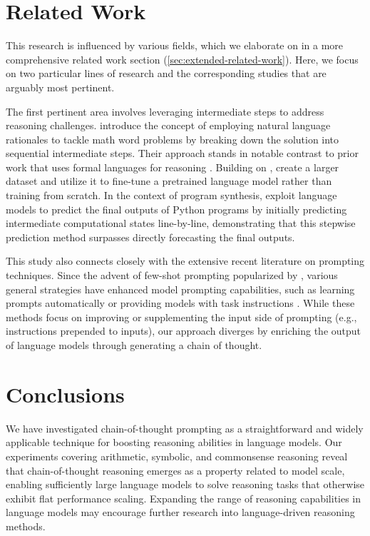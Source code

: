 \section{Related Work} This research is influenced by various fields, which we elaborate on in a more comprehensive related work section (\cref{sec:extended-related-work}). Here, we focus on two particular lines of research and the corresponding studies that are arguably most pertinent.

The first pertinent area involves leveraging intermediate steps to address reasoning challenges. \cite{ling-etal-2017-program} introduce the concept of employing natural language rationales to tackle math word problems by breaking down the solution into sequential intermediate steps. Their approach stands in notable contrast to prior work that uses formal languages for reasoning \citep{roy-2016-reasoning, chiang-chen-2019-semantically, amini-etal-2019-mathqa, chen2019neural}. Building on \citet{ling-etal-2017-program}, \citet{cobbe2021training} create a larger dataset and utilize it to fine-tune a pretrained language model rather than training from scratch. In the context of program synthesis, \cite{nye2021show} exploit language models to predict the final outputs of Python programs by initially predicting intermediate computational states line-by-line, demonstrating that this stepwise prediction method surpasses directly forecasting the final outputs.

This study also connects closely with the extensive recent literature on prompting techniques. Since the advent of few-shot prompting popularized by \citet{brown2020language}, various general strategies have enhanced model prompting capabilities, such as learning prompts automatically \citep{lester-etal-2021-power} or providing models with task instructions \citep{wei2021finetuned,sanh2021multitask,ouyang2022training}. While these methods focus on improving or supplementing the input side of prompting (e.g., instructions prepended to inputs), our approach diverges by enriching the output of language models through generating a chain of thought.

\section{Conclusions} We have investigated chain-of-thought prompting as a straightforward and widely applicable technique for boosting reasoning abilities in language models. Our experiments covering arithmetic, symbolic, and commonsense reasoning reveal that chain-of-thought reasoning emerges as a property related to model scale, enabling sufficiently large language models to solve reasoning tasks that otherwise exhibit flat performance scaling. Expanding the range of reasoning capabilities in language models may encourage further research into language-driven reasoning methods.

